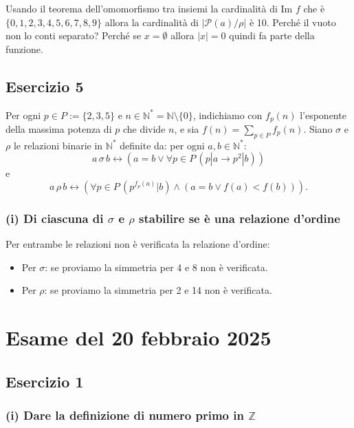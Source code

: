 Usando il teorema dell'omomorfismo tra insiemi la cardinalità di Im $f$ che è $\{0, 1, 2, 3, 4, 5, 6, 7, 8, 9\}$ allora la cardinalità di $|\mathcal{P}(a)/\rho|$ è 10. Perché il vuoto non lo conti separato? Perché se $x = \emptyset$ allora $|x| = 0$ quindi fa parte della funzione.

\subsection*{Esercizio 5}

Per ogni $p \in P := \{2,3,5\}$ e $n \in \mathbb{N}^* = \mathbb{N} \setminus \{0\}$, indichiamo con $f_p(n)$ l'esponente della massima potenza di $p$ che divide $n$, e sia $f(n) = \sum_{p \in P} f_p(n)$. Siano $\sigma$ e $\rho$ le relazioni binarie in $\mathbb{N}^*$ definite da: per ogni $a, b \in \mathbb{N}^*$:
$$a \,\sigma\, b \leftrightarrow (a = b \lor \forall p \in P\, (p|a \to p^2|b))$$
e
$$a \,\rho\, b \leftrightarrow (\forall p \in P\, (p^{f_p(a)}|b) \land (a = b \lor f(a) < f(b))).$$

\subsubsection*{(i) Di ciascuna di $\sigma$ e $\rho$ stabilire se è una relazione d'ordine}

Per entrambe le relazioni non è verificata la relazione d'ordine:

\begin{itemize}
    \item Per $\sigma$: se proviamo la simmetria per 4 e 8 non è verificata.
    
    \item Per $\rho$: se proviamo la simmetria per 2 e 14 non è verificata.
\end{itemize}

\section {Esame del 20 febbraio 2025}

\subsection*{Esercizio 1}

\subsubsection*{(i) Dare la definizione di numero primo in $\mathbb{Z}$}

